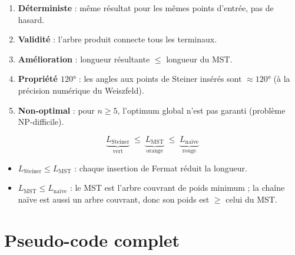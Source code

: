 \documentclass[12pt,a4paper]{article}
\begin{document}
\begin{tcolorbox}[thmbox={Résumé des garanties}]
\begin{enumerate}
  \item \textbf{Déterministe} : même résultat pour les mêmes points d'entrée,
        pas de hasard.
  \item \textbf{Validité} : l'arbre produit connecte tous les terminaux.
  \item \textbf{Amélioration} : longueur résultante $\leq$ longueur du MST.
  \item \textbf{Propriété $120°$} : les angles aux points de Steiner insérés
        sont $\approx 120°$ (à la précision numérique du Weiszfeld).
  \item \textbf{Non-optimal} : pour $n \geq 5$, l'optimum global
        n'est pas garanti (problème NP-difficile).
\end{enumerate}
\end{tcolorbox}

\begin{tcolorbox}[thmbox={Inégalité de comparaison (toujours vérifiée)}]
\[
  \underbrace{L_{\text{Steiner}}}_{\text{vert}} \;\leq\;
  \underbrace{L_{\text{MST}}}_{\text{orange}} \;\leq\;
  \underbrace{L_{\text{naïve}}}_{\text{rouge}}
\]
\begin{itemize}
  \item $L_{\text{Steiner}} \leq L_{\text{MST}}$ : chaque insertion de Fermat
        réduit la longueur.
  \item $L_{\text{MST}} \leq L_{\text{naïve}}$ : le MST est l'arbre couvrant
        de poids minimum ; la chaîne naïve est aussi un arbre couvrant,
        donc son poids est $\geq$ celui du MST.
\end{itemize}
\end{tcolorbox}

\section{Pseudo-code complet}
\end{document}
